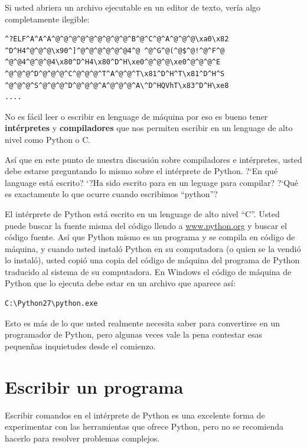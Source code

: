 Si usted abriera un archivo ejecutable en un editor de texto, ver\'ia algo completamente ilegible:

\beforeverb
\begin{verbatim}
^?ELF^A^A^A^@^@^@^@^@^@^@^@^@^B^@^C^@^A^@^@^@\xa0\x82
^D^H4^@^@^@\x90^]^@^@^@^@^@^@4^@ ^@^G^@(^@$^@!^@^F^@
^@^@4^@^@^@4\x80^D^H4\x80^D^H\xe0^@^@^@\xe0^@^@^@^E
^@^@^@^D^@^@^@^C^@^@^@^T^A^@^@^T\x81^D^H^T\x81^D^H^S
^@^@^@^S^@^@^@^D^@^@^@^A^@^@^@^A\^D^HQVhT\x83^D^H\xe8
....
\end{verbatim}
\afterverb
%
No es f\'acil leer o escribir en lenguage de m\'aquina por eso es bueno tener 
{\bf int\'erpretes} y {\bf compiladores} que nos permiten escribir en un lenguage de alto nivel
como Python o C.

As\'i que en este punto de nuestra discusi\'on sobre compiladores e int\'erpretes, usted debe estarse  
preguntando lo mismo sobre el int\'erprete de Python. ?`En qu\'e language est\'a escrito?  
`?Ha sido escrito para en un leguage para compilar? ?`Qu\'e es exactamente lo que ocurre cuando escribimos ``python''?

El int\'erprete de Python est\'a escrito en un lenguage de alto nivel ``C''.  
Usted puede buscar la fuente misma del c\'odigo llendo a \url{www.python.org} y buscar el c\'odigo fuente.
As\'i que Python mismo es un programa y se compila en c\'odigo de m\'aquina, y cuando usted instal\'o Python en su computadora (o quien se la vendi\'o lo instal\'o),
usted copi\'o una copia del c\'odigo de m\'aquina del programa de Python traducido al sistema de su computadora. En Windows el c\'odigo de m\'aquina de Python que lo ejecuta debe estar en un archivo que aparece as\'i:

\beforeverb
\begin{verbatim}
C:\Python27\python.exe
\end{verbatim}
\afterverb
%
Esto es m\'as de lo que usted realmente necesita saber para convertirse en un programador de Python, pero
algunas veces vale la pena contestar esas pequen\~nas inquietudes desde el comienzo.

\section{Escribir un programa}

Escribir comandos en el int\'erprete de Python es una excelente forma de experimentar con las herramientas que ofrece Python, pero no se recomienda hacerlo para resolver problemas complejos.

